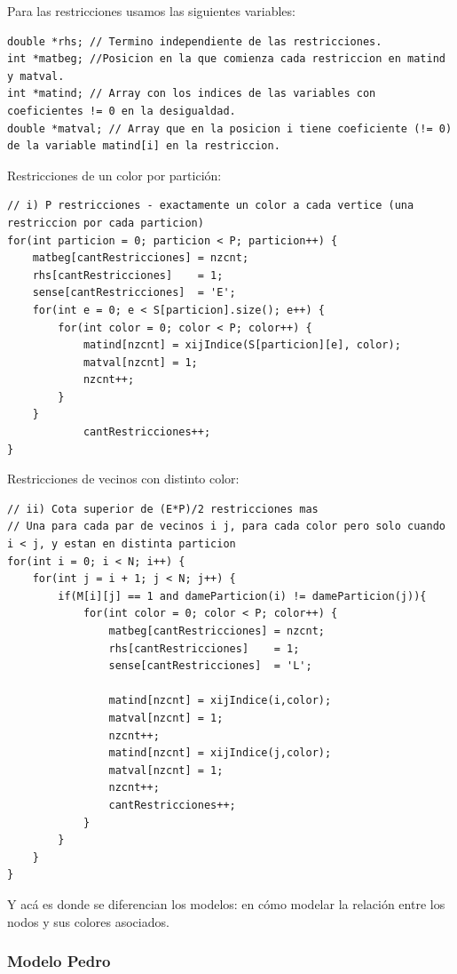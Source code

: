\documentclass[a4paper, 10pt, twoside]{article}
\begin{document}
Para las restricciones usamos las siguientes variables:

\begin{lstlisting}
double *rhs; // Termino independiente de las restricciones.
int *matbeg; //Posicion en la que comienza cada restriccion en matind y matval.
int *matind; // Array con los indices de las variables con coeficientes != 0 en la desigualdad.
double *matval; // Array que en la posicion i tiene coeficiente (!= 0) de la variable matind[i] en la restriccion.
\end{lstlisting}

Restricciones de un color por partición:

\begin{lstlisting}
// i) P restricciones - exactamente un color a cada vertice (una restriccion por cada particion)
for(int particion = 0; particion < P; particion++) {
	matbeg[cantRestricciones] = nzcnt;
	rhs[cantRestricciones]    = 1;
	sense[cantRestricciones]  = 'E';
	for(int e = 0; e < S[particion].size(); e++) {
		for(int color = 0; color < P; color++) {
			matind[nzcnt] = xijIndice(S[particion][e], color);
			matval[nzcnt] = 1;
			nzcnt++;
		}
	}
			cantRestricciones++;
}
\end{lstlisting}

Restricciones de vecinos con distinto color:

\begin{lstlisting}
// ii) Cota superior de (E*P)/2 restricciones mas
// Una para cada par de vecinos i j, para cada color pero solo cuando i < j, y estan en distinta particion
for(int i = 0; i < N; i++) {
	for(int j = i + 1; j < N; j++) { 
		if(M[i][j] == 1 and dameParticion(i) != dameParticion(j)){
			for(int color = 0; color < P; color++) {
				matbeg[cantRestricciones] = nzcnt;
				rhs[cantRestricciones]    = 1;
				sense[cantRestricciones]  = 'L';

				matind[nzcnt] = xijIndice(i,color);
				matval[nzcnt] = 1;
				nzcnt++;
				matind[nzcnt] = xijIndice(j,color);
				matval[nzcnt] = 1;
				nzcnt++;
				cantRestricciones++;
			}
		}
	}
}
\end{lstlisting}

Y acá es donde se diferencian los modelos: en cómo modelar la relación entre los nodos y sus colores asociados.

\subsubsection{Modelo Pedro}
\label{codigo-modelo-pedro}
\end{document}
